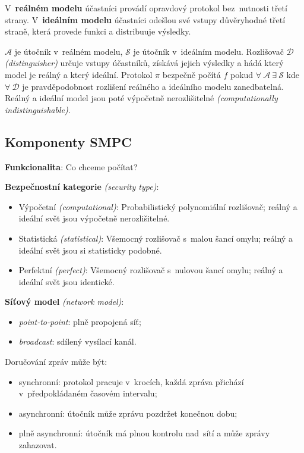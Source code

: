 V~\textbf{reálném modelu} účastníci provádí opravdový protokol bez~nutnosti třetí strany.
V~\textbf{ideálním modelu} účastníci odešlou své vstupy důvěryhodné třetí straně, která provede funkci a distribuuje výsledky.

$\mathcal{A}$ je útočník v~reálném modelu, $\mathcal{S}$ je útočník v~ideálním modelu.
Rozlišovač $\mathcal{D}$ \emph{(distinguisher)} určuje vstupy účastníků, získává jejich výsledky a hádá který model je reálný a který ideální.
Protokol $\pi$ bezpečně počítá $f$ pokud $\forall \ \mathcal{A} \ \exists \ \mathcal{S}$ kde $\forall \ \mathcal{D}$ je pravděpodobnost rozlišení reálného a ideálního modelu zanedbatelná.
Reálný a ideální model jsou poté výpočetně nerozlišitelné \emph{(computationally indistinguishable)}.


\subsection{Komponenty SMPC}

\textbf{Funkcionalita}: Co chceme počítat?

\textbf{Bezpečnostní kategorie} \emph{(security type)}:

\begin{itemize}
\item Výpočetní \emph{(computational)}: Probabilistický polynomiální rozlišovač; reálný a ideální svět jsou výpočetně nerozlišitelné.
\item Statistická \emph{(statistical)}: Všemocný rozlišovač s~malou šancí omylu; reálný a ideální svět jsou si statisticky podobné.
\item Perfektní \emph{(perfect)}: Všemocný rozlišovač s~nulovou šancí omylu; reálný a ideální svět jsou identické.
\end{itemize}

\textbf{Síťový model} \emph{(network model)}:

\begin{itemize}
\item \emph{point-to-point}: plně propojená síť;
\item \emph{broadcast}: sdílený vysílací kanál.
\end{itemize}

Doručování zpráv může být:
\begin{itemize}
\item synchronní: protokol pracuje v~krocích, každá zpráva přichází v~předpokládaném časovém intervalu;
\item asynchronní: útočník může zprávu pozdržet konečnou dobu;
\item plně asynchronní: útočník má plnou kontrolu nad~sítí a může zprávy zahazovat.
\end{itemize}

